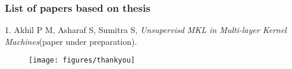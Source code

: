 \documentclass[a4paper,compress,svgnames]{beamer}
\begin{document}

\fi


\begin{frame}
\frametitle{List of papers based on thesis}
1. Akhil P M, Asharaf S, Sumitra S, {\em Unsupervisd MKL in Multi-layer Kernel Machines}(paper under preparation).
\end{frame}


\begin{frame}
\begin{figure}
\texttt{[image: figures/thankyou]}
\end{figure}
\end{frame}

\end{document}
